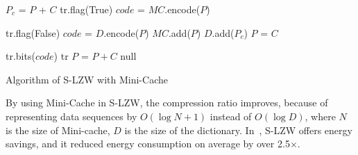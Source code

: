 \begin{algorithm}
\begin{algorithmic}[1]
\Input
\EndInput
\Output
\EndOutput

\State $P_c$ = $P$ + $C$
        \State tr.flag(True)    
        \State $code$ = $MC$.encode($P$)    
        
    \Else   {}
        \State tr.flag(False)
        \State $code$ = $D$.encode($P$)
        \State $MC$.add($P$)    
    \EndIf
    \State $D$.add($P_c$)
    \State $P$ = $C$
    
    \State tr.bits($code$)
    \State \Return tr
\Else       {}
    \State $P$ = $P+C$
    \State \Return null 
\EndIf

\end{algorithmic}
\caption{Algorithm of S-LZW with Mini-Cache}
\label{algo:S-LZW}
\end{algorithm}

By using Mini-Cache in S-LZW, the compression ratio improves, because of
representing data sequences by $O(\log N + 1)$ instead of $O(\log D)$,
where $N$ is the size of Mini-cache, $D$ is the size of the dictionary.
In~\cite{sadler2006data}, S-LZW offers energy savings, and it reduced
energy consumption on average by over 2.5$\times$.


